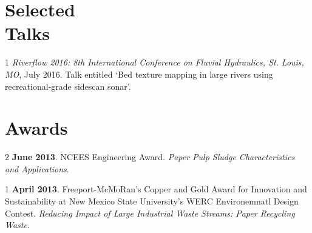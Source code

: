 \documentclass[margin,line]{resume}
\begin{document}
\begin{resume}
 	\section{\mysidestyle Selected \\Talks}
       \begin{footnotesize}
 	\begin{list1}
	 	
 	\item[1] {\sl Riverflow 2016: 8th International Conference on Fluvial Hydraulics, St. Louis, MO}, July 2016. Talk entitled `Bed texture mapping in large rivers using recreational-grade sidescan sonar'.\\
 	\end{list1}
        \end{footnotesize}

	\section{\mysidestyle Awards}
	\begin{footnotesize}
	\begin{list1}
	\item[2] {\bf June 2013}. NCEES Engineering Award. {\sl Paper Pulp Sludge Characteristics and Applications}.\\
	\item[1] {\bf April 2013}. Freeport-McMoRan's Copper and Gold Award for Innovation and Sustainability at New Mexico State University's WERC Environemnatl Design Contest. {\sl Reducing Impact of Large Industrial Waste Streams: Paper Recycling Waste}. \\
 	\end{list1}
 \end{footnotesize}

\end{resume}
\end{document}

